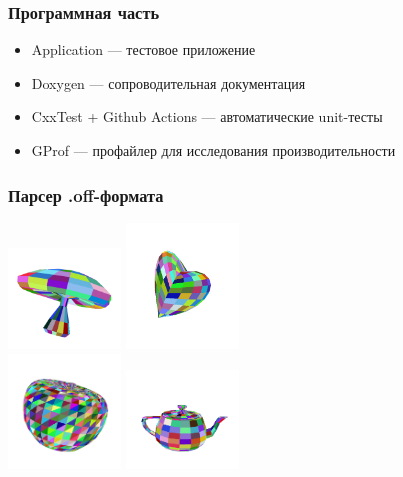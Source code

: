 \documentclass{beamer}
\begin{document}
\begin{frame}
\frametitle{Программная часть}

\begin{itemize}
\item Application --- тестовое приложение
\item Doxygen --- сопроводительная документация
\item CxxTest + Github Actions --- автоматические unit-тесты
\item GProf --- профайлер для исследования производительности
\end{itemize}
\end{frame}

\begin{frame}
\frametitle{Парсер .off-формата}

\begin{center}
\includegraphics[width=3cm]{../example/mushroom.png}
\includegraphics[width=3cm]{../example/heart.png}
\\
\includegraphics[width=3cm]{../example/apple.png}
\includegraphics[width=3cm]{../example/teapot.png}
\end{center}
\end{frame}
\end{document}
